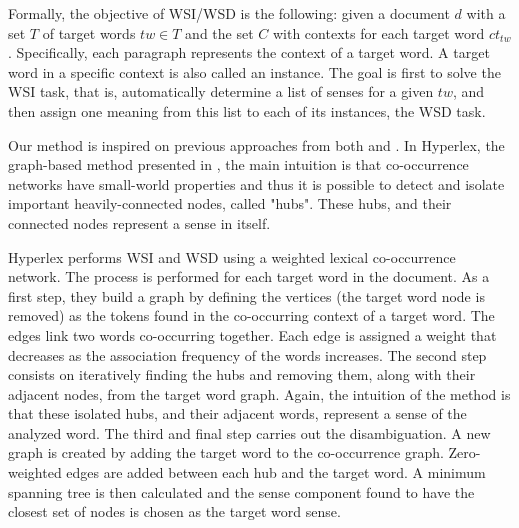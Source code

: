 

Formally, the objective of WSI/WSD is the following: given a document $d$ with a set $T$ of  target words $tw \in T$ and the set $C$ with contexts for each target word $ct_{tw}$. 
Specifically, each paragraph represents the context  of a target word. A target word in a specific context is also called an instance.
The goal is first to solve the WSI task, that is, automatically determine a list of senses for a given $tw$, and then assign one meaning from this list to each of its instances, the WSD task.
%


Our method  is inspired on previous approaches from both \cite{2004.Veronis} and \cite{2007.Klapaftis.UOY}. In Hyperlex,  the graph-based  method presented  in \cite{2004.Veronis}, the main intuition is that co-occurrence networks have small-world properties and thus it is possible to detect and isolate important heavily-connected nodes, called "hubs". These hubs, and their connected nodes represent a sense in itself. 

Hyperlex performs WSI and WSD using a weighted lexical co-occurrence network. The process is performed for each target word in the document. As a first step, they build a  graph by defining the vertices (the target word node is removed) as the tokens found in the  co-occurring  context of a target word. The edges link two words co-occurring together. Each edge is assigned a weight that decreases as the association frequency of the words increases. The second step consists on iteratively finding the hubs and removing them, along with their adjacent nodes, from the target word graph. Again, the intuition of the method is that these isolated hubs, and their adjacent words, represent a sense of the analyzed word. The third and final step carries out the disambiguation. A new graph is created by adding the target word to the co-occurrence graph. Zero-weighted edges are added between each hub and the target word. A minimum spanning tree is then calculated and the sense component found to have the closest set of nodes is chosen as the target word sense.

